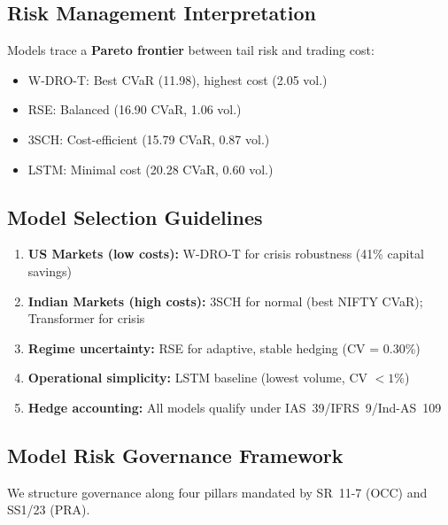 \documentclass[11pt]{article}
\begin{document}
\subsection{Risk Management Interpretation}

Models trace a \textbf{Pareto frontier} between tail risk and trading cost:
\begin{itemize}[noitemsep]
    \item W-DRO-T: Best CVaR (11.98), highest cost (2.05 vol.)
    \item RSE: Balanced (16.90 CVaR, 1.06 vol.)
    \item 3SCH: Cost-efficient (15.79 CVaR, 0.87 vol.)
    \item LSTM: Minimal cost (20.28 CVaR, 0.60 vol.)
\end{itemize}

\subsection{Model Selection Guidelines}

\begin{tcolorbox}[title=Deployment Recommendations by Market Context]
\small
\begin{enumerate}[noitemsep,leftmargin=*]
    \item \textbf{US Markets (low costs):} W-DRO-T for crisis robustness (41\% capital savings)
    \item \textbf{Indian Markets (high costs):} 3SCH for normal (best NIFTY CVaR); Transformer for crisis
    \item \textbf{Regime uncertainty:} RSE for adaptive, stable hedging (CV = 0.30\%)
    \item \textbf{Operational simplicity:} LSTM baseline (lowest volume, CV $< 1\%$)
    \item \textbf{Hedge accounting:} All models qualify under IAS~39/IFRS~9/Ind-AS~109
\end{enumerate}
\end{tcolorbox}

\subsection{Model Risk Governance Framework}

We structure governance along four pillars mandated by SR~11-7 (OCC) and SS1/23 (PRA).
\end{document}
